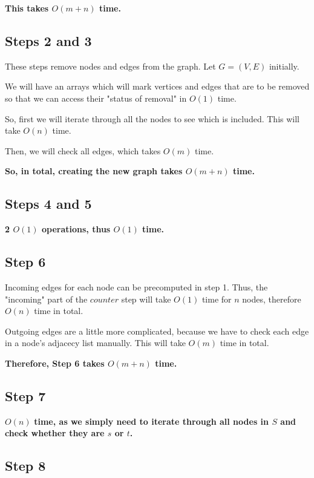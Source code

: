 \documentclass{article}
\begin{document}
\textbf{This takes $O(m+n)$ time.}

\subsection*{Steps 2 and 3}

These steps remove nodes and edges from the graph. Let $G = (V,E)$ initially. 

We will have an arrays which will mark vertices and edges that are to be removed so that we can access their "status of removal" in $O(1)$ time. 

So, first we will iterate through all the nodes to see which is included. This will take $O(n)$ time. 

Then, we will check all edges, which takes $O(m)$ time.

\textbf{So, in total, creating the new graph takes $O(m + n)$ time.}

\subsection*{Steps 4 and 5}

\textbf{2 $O(1)$ operations, thus $O(1)$ time.}

\subsection*{Step 6}

Incoming edges for each node can be precomputed in step 1. Thus, the "incoming" part of the $counter$ step will take $O(1)$ time for $n$ nodes, therefore $O(n)$ time in total.

Outgoing edges are a little more complicated, because we have to check each edge in a node's adjacecy list manually. This will take $O(m)$ time in total.

\textbf{Therefore, Step 6 takes $O(m+n)$ time.}

\subsection*{Step 7}

$O(n)$ \textbf{time, as we simply need to iterate through all nodes in $S$ and check whether they are $s$ or $t$.}

\subsection*{Step 8}
\end{document}
